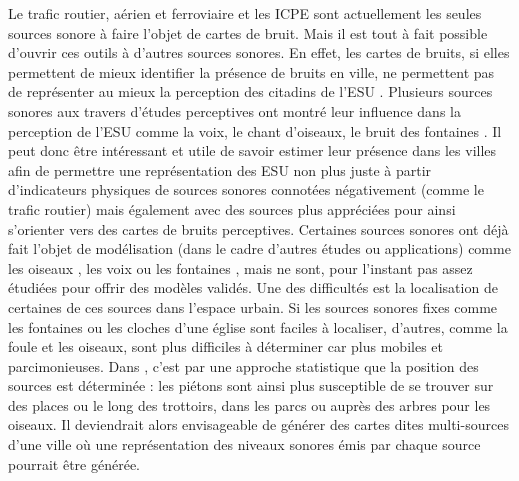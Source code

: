 Le trafic routier, aérien et ferroviaire et les ICPE sont actuellement les seules sources sonore à faire l'objet de cartes de bruit. Mais il est tout à fait possible d'ouvrir ces outils à d'autres sources sonores. 
En effet, les cartes de bruits, si elles permettent de mieux identifier la présence de bruits en ville, ne permettent pas de représenter au mieux la perception des citadins de l'ESU \cite{brown2012review}. Plusieurs sources sonores aux travers d'études perceptives ont montré leur influence dans la perception de l'ESU comme la voix, le chant d'oiseaux, le bruit des fontaines \cite{lavandier2006contribution,hong2013designing}. 
Il peut donc être intéressant et utile de savoir estimer leur présence dans les villes afin de permettre une représentation des ESU non plus juste à partir d'indicateurs physiques de sources sonores connotées négativement (comme le trafic routier) mais également avec des sources plus appréciées pour ainsi s'orienter vers des cartes de bruits perceptives.  
Certaines sources sonores ont déjà fait l'objet de modélisation (dans le cadre d'autres études ou applications) comme les oiseaux \cite{nemeth2013bird}, les voix \cite{hayne2011prediction} ou les fontaines \cite{watts2009measurement}, mais ne sont, pour l'instant pas assez étudiées pour offrir des modèles validés. 
Une des difficultés est la localisation de certaines de ces sources dans l'espace urbain. Si les sources sonores fixes comme les fontaines ou les cloches d'une église sont faciles à localiser, d'autres, comme la foule et les oiseaux, sont plus difficiles à déterminer car plus mobiles et parcimonieuses. Dans \cite{aumond2018probabilistic}, c'est par une approche statistique que la position des sources est déterminée : les piétons sont ainsi plus susceptible de se trouver sur des places ou le long des trottoirs, dans les parcs ou auprès des arbres pour les oiseaux. Il deviendrait alors envisageable de générer des cartes dites multi-sources d'une ville où une représentation des niveaux sonores émis par chaque source pourrait être générée. 



